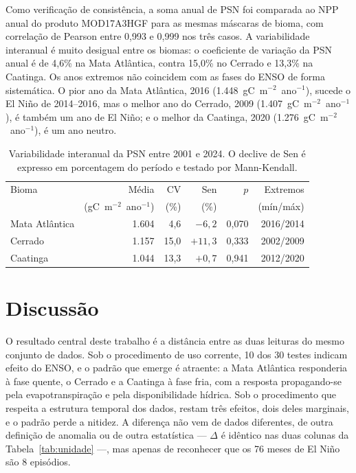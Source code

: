 \documentclass[a4paper,fleqn]{cas-sc}
\begin{document}
Como verificação de consistência, a soma anual de PSN foi comparada ao NPP anual do produto MOD17A3HGF para as mesmas máscaras de bioma, com correlação de Pearson entre 0,993 e 0,999 nos três casos. A variabilidade interanual é muito desigual entre os biomas: o coeficiente de variação da PSN anual é de 4,6\% na Mata Atlântica, contra 15,0\% no Cerrado e 13,3\% na Caatinga. Os anos extremos não coincidem com as fases do ENSO de forma sistemática. O pior ano da Mata Atlântica, 2016 (1.448~gC~m$^{-2}$~ano$^{-1}$), sucede o El Niño de 2014--2016, mas o melhor ano do Cerrado, 2009 (1.407~gC~m$^{-2}$~ano$^{-1}$), é também um ano de El Niño; e o melhor da Caatinga, 2020 (1.276~gC~m$^{-2}$~ano$^{-1}$), é um ano neutro.

\begin{table}[width=\linewidth,cols=6,pos=h]
\caption{Variabilidade interanual da PSN entre 2001 e 2024. O declive de Sen é expresso em porcentagem do período e testado por Mann-Kendall.}
\label{tab:interanual}
\begin{tabular*}{\tblwidth}{@{}lrrrrr@{}}
\toprule
Bioma & Média & CV & Sen & $p$ & Extremos \\
 & (gC~m$^{-2}$~ano$^{-1}$) & (\%) & (\%) & & (mín/máx) \\
\midrule
Mata Atlântica & 1.604 & 4,6  & $-6{,}2$  & 0,070 & 2016/2014 \\
Cerrado        & 1.157 & 15,0 & $+11{,}3$ & 0,333 & 2002/2009 \\
Caatinga       & 1.044 & 13,3 & $+0{,}7$  & 0,941 & 2012/2020 \\
\bottomrule
\end{tabular*}
\end{table}

\section{Discussão}

O resultado central deste trabalho é a distância entre as duas leituras do mesmo conjunto de dados. Sob o procedimento de uso corrente, 10 dos 30 testes indicam efeito do ENSO, e o padrão que emerge é atraente: a Mata Atlântica responderia à fase quente, o Cerrado e a Caatinga à fase fria, com a resposta propagando-se pela evapotranspiração e pela disponibilidade hídrica. Sob o procedimento que respeita a estrutura temporal dos dados, restam três efeitos, dois deles marginais, e o padrão perde a nitidez. A diferença não vem de dados diferentes, de outra definição de anomalia ou de outra estatística --- $\Delta$ é idêntico nas duas colunas da Tabela~\ref{tab:unidade} ---, mas apenas de reconhecer que os 76 meses de El Niño são 8 episódios.
\end{document}
